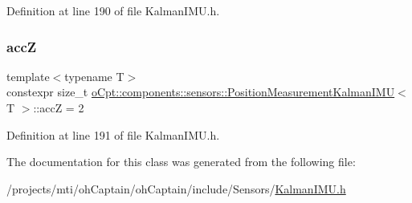 Definition at line 190 of file Kalman\+I\+M\+U.\+h.

\hypertarget{classo_cpt_1_1components_1_1sensors_1_1_position_measurement_kalman_i_m_u_a5d488a90f440b0c0b6a005ec220d88f6}{}\label{classo_cpt_1_1components_1_1sensors_1_1_position_measurement_kalman_i_m_u_a5d488a90f440b0c0b6a005ec220d88f6} 
\subsubsection{\texorpdfstring{accZ}{accZ}}
{\footnotesize\ttfamily template$<$typename T$>$ \\
constexpr size\+\_\+t \hyperlink{classo_cpt_1_1components_1_1sensors_1_1_position_measurement_kalman_i_m_u}{o\+Cpt\+::components\+::sensors\+::\+Position\+Measurement\+Kalman\+I\+MU}$<$ T $>$\+::accZ = 2\hspace{0.3cm}{\ttfamily [static]}}



Definition at line 191 of file Kalman\+I\+M\+U.\+h.



The documentation for this class was generated from the following file\+:\begin{DoxyCompactItemize}
\item 
/projects/mti/oh\+Captain/oh\+Captain/include/\+Sensors/\hyperlink{_kalman_i_m_u_8h}{Kalman\+I\+M\+U.\+h}\end{DoxyCompactItemize}
